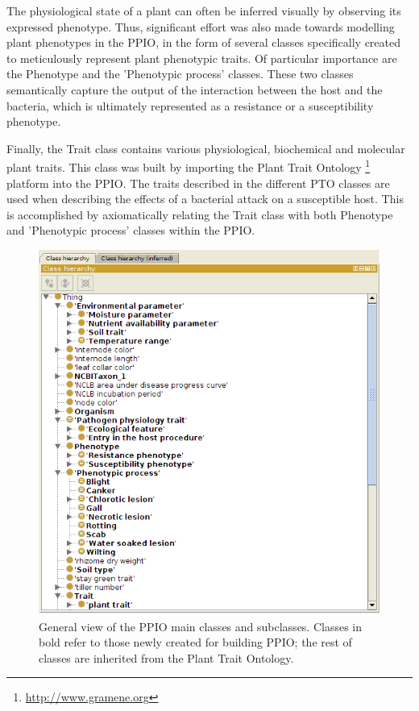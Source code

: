 \documentclass[sw]{iosart2c}
\newcommand{\myurl}[1]{\footnote{\url{#1}}}
\begin{document}
The physiological state of a plant can often be inferred visually by observing its expressed phenotype. Thus, significant effort was also made towards modelling plant phenotypes in the PPIO, in the form of several classes specifically created to meticulously represent plant phenotypic traits.  Of particular importance are the {\sf Phenotype} and the {\sf 'Phenotypic process'} classes. These two classes semantically capture the output of the interaction between the host and the bacteria, which is ultimately represented as a resistance or a susceptibility phenotype.

Finally, the {\sf Trait} class contains various physiological, biochemical and molecular plant traits. This class was built by importing the Plant Trait Ontology \myurl{http://www.gramene.org} platform \cite{PTO} into the PPIO. The traits described in the different PTO classes are used when describing the effects of a bacterial attack on a susceptible host. This is accomplished by axiomatically relating the {\sf Trait} class with both {\sf Phenotype} and {\sf 'Phenotypic process'} classes within the PPIO.

\begin{figure}
\includegraphics{PPIO-classes2.png}
\caption{General view of the PPIO main classes and subclasses. Classes in bold refer to those newly created for building PPIO; the rest of classes are inherited from the Plant Trait Ontology.}\label{fig:ppio-classes}
\end{figure}
\end{document}
